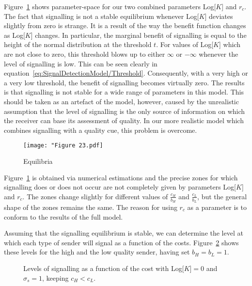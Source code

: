 \documentclass[a4paper,12pt]{article}
\numberwithin{equation}{section}
\begin{document}
Figure~\ref{fig:Figure 23.pdf} shows parameter-space for our two combined parameters Log[$K$] and $r_{c}$. The fact that signalling is not a stable equilibrium whenever Log[$K$] deviates slightly from zero is strange. It is a result of the way the benefit function changes as Log[$K$] changes. In particular, the marginal benefit of signalling is equal to the height of the normal distribution at the threshold $t$. For values of Log[$K$] which are not close to zero, this threshold blows up to either $\infty$ or $-\infty$ whenever the level of signalling is low. This can be seen clearly in equation~\ref{eq:SignalDetectionModel/Threshold}. Consequently, with a very high or a very low threshold, the benefit of signalling becomes virtually zero. The results is that signalling is not stable for a wide range of parameters in this model. This should be taken as an artefact of the model, however, caused by the unrealistic assumption that the level of signalling is the only source of information on which the receiver can base its assessment of quality. In our more realistic model which combines signalling with a quality cue, this problem is overcome.

\begin{figure}[h]
\begin{center}
\leavevmode
\texttt{[image: "Figure 23.pdf]}
\caption{Equilibria}
\label{fig:Figure 23.pdf}
\end{center}
\end{figure}

Figure~\ref{fig:Figure 23.pdf} is obtained via numerical estimations and the precise zones for which signalling does or does not occur are not completely given by parameters Log[$K$] and $r_{c}$. The zones change slightly for different values of $\frac{c_{H}}{b_{H}}$ and $\frac{c_{L}}{b_{L}}$, but the general shape of the zones remains the same. The reason for using $r_{c}$ as a parameter is to conform to the results of the full model.

Assuming that the signalling equilibrium is stable, we can determine the level at which each type of sender will signal as a function of the costs. Figure~\ref{fig:Figure 2425} shows these levels for the high and the low quality sender, having set $b_{H}=b_{L}=1$.
\begin{figure}[h]
\captionsetup{width=380pt}
\begin{center}
\hspace{10mm}
\caption{Levels of signalling as a function of the cost with Log[$K$]$=0$ and $\sigma_{s}=1$, keeping $c_{H}<c_{L}$.}
\label{fig:Figure 2425}
\end{center}
\end{figure}
\end{document}
